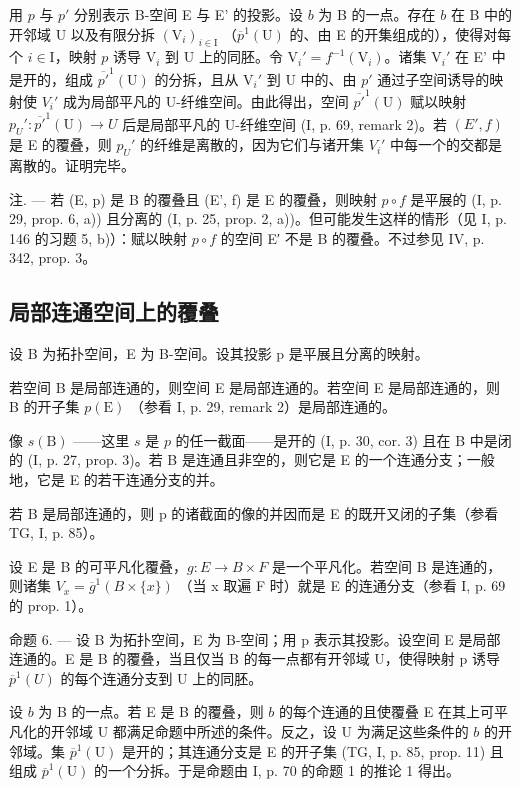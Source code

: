 用 \(p\) 与 \(p'\) 分别表示 B-空间 E 与 E' 的投影。设 \(b\) 为 B 的一点。存在 \(b\) 在 B 中的开邻域 U 以及有限分拆 \((\mathrm{V}_i)_{i\in \mathrm{I}}\) （\(\overline{p}^1 (\mathrm{U})\) 的、由 E 的开集组成的），使得对每个 \(i\in \mathrm{I}\)，映射 \(p\) 诱导 \(\mathrm{V}_i\) 到 U 上的同胚。令 \(\mathrm{V}_i' = f^{-1}(\mathrm{V}_i)\)。诸集 \(\mathrm{V}_i'\) 在 E' 中是开的，组成 \(\overline{p'}^{1}(\mathrm{U})\) 的分拆，且从 \(\mathrm{V}_i'\) 到 U 中的、由 \(p'\) 通过子空间诱导的映射使 \(V_i'\) 成为局部平凡的 U-纤维空间。由此得出，空间 \(\overline{p'}^{1}(\mathrm{U})\) 赋以映射 \(p_U': \overline{p'}^{1}(\mathrm{U}) \to U\) 后是局部平凡的 U-纤维空间 (I, p. 69, remark 2)。若 \((E', f)\) 是 E 的覆叠，则 \(p_U'\) 的纤维是离散的，因为它们与诸开集 \(V_i'\) 中每一个的交都是离散的。证明完毕。

注. --- 若 (E, p) 是 B 的覆叠且 (E', f) 是 E 的覆叠，则映射 \(p \circ f\) 是平展的 (I, p. 29, prop. 6, a)) 且分离的 (I, p. 25, prop. 2, a))。但可能发生这样的情形（见 I, p. 146 的习题 5, b)）：赋以映射 \(p \circ f\) 的空间 E′ 不是 B 的覆叠。不过参见 IV, p. 342, prop. 3。

\subsection{局部连通空间上的覆叠}

设 B 为拓扑空间，E 为 B-空间。设其投影 p 是平展且分离的映射。

若空间 B 是局部连通的，则空间 E 是局部连通的。若空间 E 是局部连通的，则 B 的开子集 \(p(\mathrm{E})\) （参看 I, p. 29, remark 2）是局部连通的。

像 \(s(\mathrm{B})\) ——这里 \(s\) 是 \(p\) 的任一截面——是开的 (I, p. 30, cor. 3) 且在 B 中是闭的 (I, p. 27, prop. 3)。若 B 是连通且非空的，则它是 E 的一个连通分支；一般地，它是 E 的若干连通分支的并。

若 B 是局部连通的，则 p 的诸截面的像的并因而是 E 的既开又闭的子集（参看 TG, I, p. 85）。

设 E 是 B 的可平凡化覆叠，\(g: E \to B \times F\) 是一个平凡化。若空间 B 是连通的，则诸集 \(V_{x} = \overline{g}^{1}(B \times \{x\})\) （当 x 取遍 F 时）就是 E 的连通分支（参看 I, p. 69 的 prop. 1）。

命题 6. --- 设 B 为拓扑空间，E 为 B-空间；用 p 表示其投影。设空间 E 是局部连通的。E 是 B 的覆叠，当且仅当 B 的每一点都有开邻域 U，使得映射 p 诱导 \(\overline{p}^{1}(U)\) 的每个连通分支到 U 上的同胚。

设 \(b\) 为 B 的一点。若 E 是 B 的覆叠，则 \(b\) 的每个连通的且使覆叠 E 在其上可平凡化的开邻域 U 都满足命题中所述的条件。反之，设 U 为满足这些条件的 \(b\) 的开邻域。集 \(\overline{p}^{1}(\mathrm{U})\) 是开的；其连通分支是 E 的开子集 (TG, I, p. 85, prop. 11) 且组成 \(\overline{p}^{1}(\mathrm{U})\) 的一个分拆。于是命题由 I, p. 70 的命题 1 的推论 1 得出。

